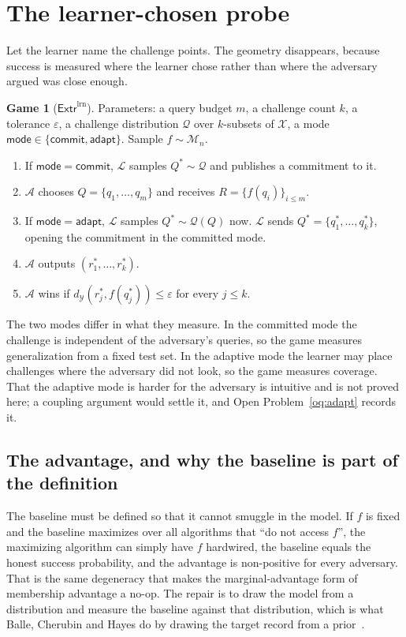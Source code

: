 \documentclass[11pt]{article}
\theoremstyle{definition}
\newtheorem{game}{Game}
\theoremstyle{plain}
\newcommand{\A}{\mathcal{A}}
\newcommand{\Lrn}{\mathcal{L}}
\newcommand{\X}{\mathcal{X}}
\newcommand{\Y}{\mathcal{Y}}
\newcommand{\Q}{\mathcal{Q}}
\newcommand{\M}{\mathcal{M}}
\begin{document}
\section{The learner-chosen probe}
\label{sec:g2}

Let the learner name the challenge points. The geometry disappears, because success
is measured where the learner chose rather than where the adversary argued was
close enough.

\begin{game}[$\mathsf{Extr}^{\mathrm{lrn}}$]
\label{game:g2}
Parameters: a query budget $m$, a challenge count $k$, a tolerance $\varepsilon$, a
challenge distribution $\Q$ over $k$-subsets of $\X$, a mode
$\mathsf{mode} \in \{\mathsf{commit},\mathsf{adapt}\}$. Sample $f \sim \M_n$.
\begin{enumerate}
  \item If $\mathsf{mode} = \mathsf{commit}$, $\Lrn$ samples $Q^* \sim \Q$ and
        publishes a commitment to it.
  \item $\A$ chooses $Q = \{q_1,\dots,q_m\}$ and receives $R = \{f(q_i)\}_{i\le m}$.
  \item If $\mathsf{mode} = \mathsf{adapt}$, $\Lrn$ samples $Q^* \sim \Q(Q)$ now.
        $\Lrn$ sends $Q^* = \{q^*_1,\dots,q^*_k\}$, opening the commitment in the
        committed mode.
  \item $\A$ outputs $(r^*_1,\dots,r^*_k)$.
  \item $\A$ wins if $d_\Y(r^*_j, f(q^*_j)) \le \varepsilon$ for every $j \le k$.
\end{enumerate}
\end{game}

The two modes differ in what they measure. In the committed mode the challenge is
independent of the adversary's queries, so the game measures generalization from a
fixed test set. In the adaptive mode the learner may place challenges where the
adversary did not look, so the game measures coverage. That the adaptive mode is
harder for the adversary is intuitive and is not proved here; a coupling argument
would settle it, and Open Problem~\ref{oq:adapt} records it.

\subsection{The advantage, and why the baseline is part of the definition}

The baseline must be defined so that it cannot smuggle in the model. If $f$ is
fixed and the baseline maximizes over all algorithms that ``do not access $f$'',
the maximizing algorithm can simply have $f$ hardwired, the baseline equals the
honest success probability, and the advantage is non-positive for every adversary.
That is the same degeneracy that makes the marginal-advantage form of membership
advantage a no-op. The repair is to draw the model from a distribution and measure
the baseline against that distribution, which is what Balle, Cherubin and Hayes do
by drawing the target record from a prior~\cite{BCH22}.
\end{document}
